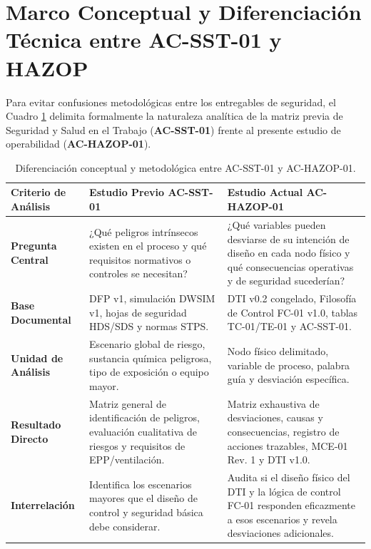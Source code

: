 \documentclass[10pt,letterpaper]{article}
\begin{document}
\section{Marco Conceptual y Diferenciación Técnica entre AC-SST-01 y HAZOP}
Para evitar confusiones metodológicas entre los entregables de seguridad, el Cuadro \ref{tab:dif_sst_hazop} delimita formalmente la naturaleza analítica de la matriz previa de Seguridad y Salud en el Trabajo (\textbf{AC-SST-01}) frente al presente estudio de operabilidad (\textbf{AC-HAZOP-01}).

\begin{table}[H]
\centering\small
\caption{Diferenciación conceptual y metodológica entre AC-SST-01 y AC-HAZOP-01.} \label{tab:dif_sst_hazop}
\begin{tabularx}{\textwidth}{p{3.2cm} X X}
\toprule
\textbf{Criterio de Análisis} & \textbf{Estudio Previo AC-SST-01} & \textbf{Estudio Actual AC-HAZOP-01} \\
\midrule
\textbf{Pregunta Central} & ¿Qué peligros intrínsecos existen en el proceso y qué requisitos normativos o controles se necesitan? & ¿Qué variables pueden desviarse de su intención de diseño en cada nodo físico y qué consecuencias operativas y de seguridad sucederían? \\
\textbf{Base Documental} & DFP v1, simulación DWSIM v1, hojas de seguridad HDS/SDS y normas STPS. & DTI v0.2 congelado, Filosofía de Control FC-01 v1.0, tablas TC-01/TE-01 y AC-SST-01. \\
\textbf{Unidad de Análisis} & Escenario global de riesgo, sustancia química peligrosa, tipo de exposición o equipo mayor. & Nodo físico delimitado, variable de proceso, palabra guía y desviación específica. \\
\textbf{Resultado Directo} & Matriz general de identificación de peligros, evaluación cualitativa de riesgos y requisitos de EPP/ventilación. & Matriz exhaustiva de desviaciones, causas y consecuencias, registro de acciones trazables, MCE-01 Rev. 1 y DTI v1.0. \\
\textbf{Interrelación} & Identifica los escenarios mayores que el diseño de control y seguridad básica debe considerar. & Audita si el diseño físico del DTI y la lógica de control FC-01 responden eficazmente a esos escenarios y revela desviaciones adicionales. \\
\bottomrule
\end{tabularx}
\end{table}
\end{document}
